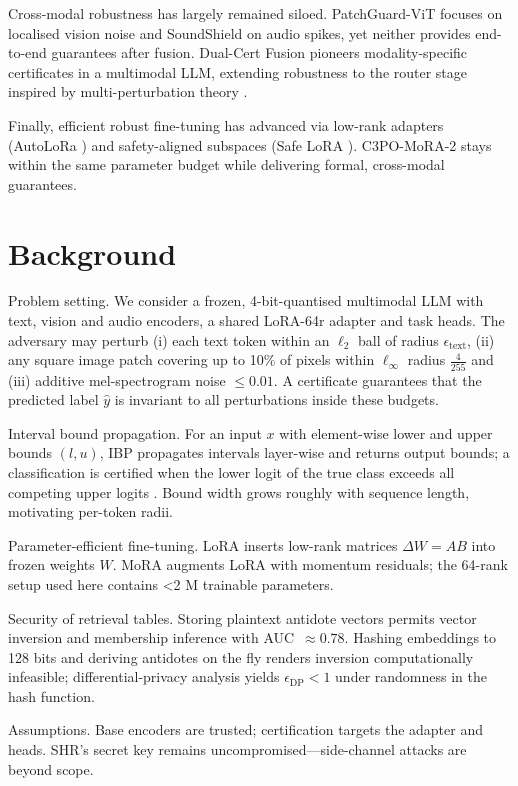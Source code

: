 \documentclass{article}
\begin{document}
Cross-modal robustness has largely remained siloed. PatchGuard-ViT focuses on localised vision noise \cite{navaneet-2023-slowformer} and SoundShield on audio spikes, yet neither provides end-to-end guarantees after fusion. Dual-Cert Fusion pioneers modality-specific certificates in a multimodal LLM, extending robustness to the router stage inspired by multi-perturbation theory \cite{tramr-2019-adversarial}.

Finally, efficient robust fine-tuning has advanced via low-rank adapters (AutoLoRa \cite{xu-2023-autolora}) and safety-aligned subspaces (Safe LoRA \cite{hsu-2024-safe}). C3PO-MoRA-2 stays within the same parameter budget while delivering formal, cross-modal guarantees.

\section{Background}
Problem setting. We consider a frozen, 4-bit-quantised multimodal LLM with text, vision and audio encoders, a shared LoRA-64r adapter and task heads. The adversary may perturb (i) each text token within an $\ell_2$ ball of radius $\epsilon_{\text{text}}$, (ii) any square image patch covering up to 10\% of pixels within $\ell_\infty$ radius $\tfrac{4}{255}$ and (iii) additive mel-spectrogram noise $\le 0.01$. A certificate guarantees that the predicted label $\hat y$ is invariant to all perturbations inside these budgets.

Interval bound propagation. For an input $x$ with element-wise lower and upper bounds $(l,u)$, IBP propagates intervals layer-wise and returns output bounds; a classification is certified when the lower logit of the true class exceeds all competing upper logits \cite{zhang-2020-robustness}. Bound width grows roughly with sequence length, motivating per-token radii.

Parameter-efficient fine-tuning. LoRA inserts low-rank matrices $\Delta W = AB$ into frozen weights $W$. MoRA augments LoRA with momentum residuals; the 64-rank setup used here contains <2 M trainable parameters.

Security of retrieval tables. Storing plaintext antidote vectors permits vector inversion and membership inference with AUC~$\approx 0.78$. Hashing embeddings to 128 bits and deriving antidotes on the fly renders inversion computationally infeasible; differential-privacy analysis yields $\epsilon_{\mathrm{DP}}<1$ under randomness in the hash function.

Assumptions. Base encoders are trusted; certification targets the adapter and heads. SHR’s secret key remains uncompromised—side-channel attacks are beyond scope.
\end{document}
